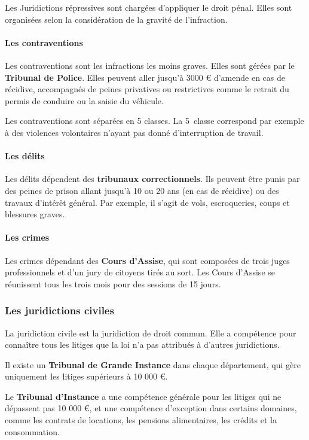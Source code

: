 \documentclass[10pt,a4paper]{article}
\begin{document}
Les Juridictions répressives sont chargées d'appliquer le droit pénal. Elles sont organisées selon la considération de la gravité de l'infraction.

\paragraph{Les contraventions}

Les contraventions sont les infractions les moins graves. Elles sont gérées par le \textbf{Tribunal de Police}. Elles peuvent aller jusqu'à 3000 \euro{} d'amende en cas de récidive, accompagnés de peines privatives ou restrictives comme le retrait du permis de conduire ou la saisie du véhicule.

Les contraventions sont séparées en 5 classes. La 5\ieme ~classe correspond par exemple à des violences volontaires n'ayant pas donné d'interruption de travail.

\paragraph{Les délits}

Les délits dépendent des \textbf{tribunaux correctionnels}. Ils peuvent être punis par des peines de prison allant jusqu'à 10 ou 20 ans (en cas de récidive) ou des travaux d'intérêt général.
Par exemple, il s'agit de vols, escroqueries, coups et blessures graves.

\paragraph{Les crimes}

Les crimes dépendant des \textbf{Cours d'Assise}, qui sont composées de trois juges professionnels et d'un jury de citoyens tirés au sort. Les Cours d'Assise se réunissent tous les trois mois pour des sessions de 15 jours.

\subsubsection{Les juridictions civiles}

La juridiction civile est la juridiction de droit commun. Elle a compétence pour connaître tous les litiges que la loi n'a pas attribués à d'autres juridictions.

Il existe un \textbf{Tribunal de Grande Instance} dans chaque département, qui gère uniquement les litiges supérieurs à 10 000 \euro{}.

Le \textbf{Tribunal d'Instance} a une compétence générale pour les litiges qui ne dépassent pas 10 000 \euro{}, et une compétence d'exception dans certains domaines, comme les contrats de locations, les pensions alimentaires, les crédits et la consommation.
\end{document}
